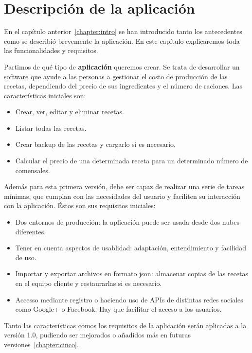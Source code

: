 \documentclass[a4paper,14pt]{book}
\begin{document}
\chapter{Descripción de la aplicaci\'on}\label{dos}

En el capítulo anterior~\ref{chapter:intro} se han introducido tanto los antecedentes como se describió brevemente la aplicación. En este capítulo explicaremos toda las funcionalidades y requisitos.

Partimos de qué tipo de \textbf{aplicación} queremos crear. Se trata de desarrollar un software que ayude a las personas a gestionar el costo de producción de las recetas, dependiendo del precio de sus ingredientes y el número de raciones. Las características iniciales son:
\begin{itemize}
	\item Crear, ver, editar y eliminar recetas.
	\item Listar todas las recetas.
	\item Crear backup de las recetas y cargarlo si es necesario.
	\item Calcular el precio de una determinada receta para un determinado número de comensales.
\end{itemize}

Además para esta primera versión, debe ser capaz de realizar una serie de tareas mínimas, que cumplan con las necesidades del usuario y faciliten su interacción con la aplicación. Éstos son sus requisitos iniciales:
\begin{itemize}
	\item Dos entornos de producción: la aplicación puede ser usada desde dos nubes diferentes.
	\item Tener en cuenta aspectos de usablidad: adaptación, entendimiento y facilidad de uso.
	\item Importar y exportar archivos en formato json: almacenar copias de las recetas en el equipo cliente y restaurarlas si es necesario.
	\item Accesso mediante registro o haciendo uso de APIs de distintas redes sociales como Google+ o Facebook. Hay que facilitar el acceso a los usuarios.
\end{itemize}

Tanto las características comos los requisitos de la aplicación serán aplicadas a la versión 1.0, pudiendo ser mejorados o añadidos más en futuras versiones~\ref{chapter:cinco}.
\end{document}
